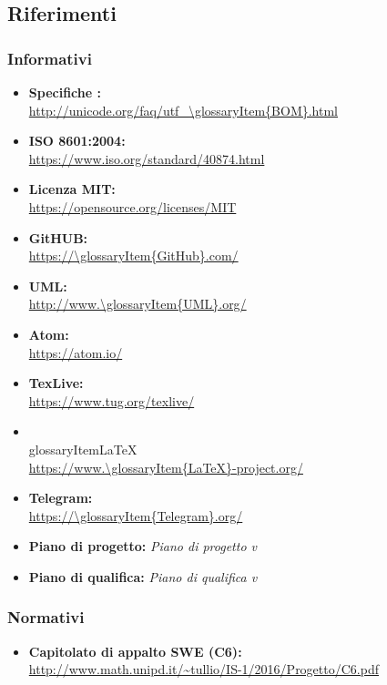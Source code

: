   \subsection{Riferimenti}
    \subsubsection{Informativi}
      \begin{itemize}
        \item \textbf{Specifiche :}\\
        \url{http://unicode.org/faq/utf_\glossaryItem{BOM}.html}
        \item \textbf{ISO 8601:2004:} \\
        \url{https://www.iso.org/standard/40874.html}\\
        \item \textbf{Licenza MIT:}\\
        \url{https://opensource.org/licenses/MIT}
        \item \textbf{GitHUB:}\\
        \url{https://\glossaryItem{GitHub}.com/}
        \item \textbf{UML:} \\
        \url{http://www.\glossaryItem{UML}.org/}
        \item \textbf{Atom:}\\
        \url{https://atom.io/}
        \item \textbf{TexLive:}\\
        \url{https://www.tug.org/texlive/}
        \item \\glossaryItem{LaTeX}\\
        \url{https://www.\glossaryItem{LaTeX}-project.org/}
        \item \textbf{Telegram:}\\
        \url{https://\glossaryItem{Telegram}.org/}
        \item \textbf{Piano di progetto:} \emph{Piano di progetto v}\VersionePP{}
        \item \textbf{Piano di qualifica:} \emph{Piano di qualifica v}\VersionePQ{}
      \end{itemize}
    \subsubsection{Normativi}
      \begin{itemize}
        \item \textbf{Capitolato di appalto SWE (C6):}\\
        \url{http://www.math.unipd.it/~tullio/IS-1/2016/Progetto/C6.pdf}
      \end{itemize}
